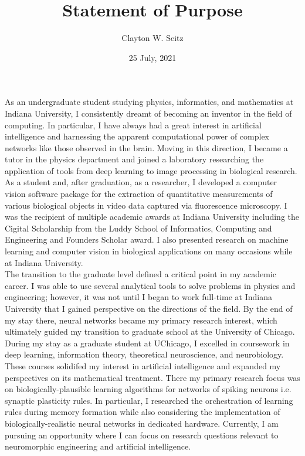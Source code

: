 \documentclass{article}
\title{Statement of Purpose}
\author{Clayton W. Seitz}
\date{25 July, 2021}
\begin{document}
  \maketitle%
\vspace{0.4in}

\indent As an undergraduate student studying physics, informatics, and mathematics at Indiana University, I consistently dreamt of becoming an inventor in the field of computing. In particular, I have always had a great interest in artificial intelligence and harnessing the apparent computational power of complex networks like those observed in the brain. Moving in this direction, I became a tutor in the physics department and joined a laboratory researching the application of tools from deep learning to image processing in biological research. As a student and, after graduation, as a researcher, I developed a computer vision software package for the extraction of quantitative measurements of various biological objects in video data captured via fluorescence microscopy. I was the recipient of multiple academic awards at Indiana University including the Cigital Scholarship from the Luddy School of Informatics, Computing and Engineering and Founders Scholar award. I also presented research on machine learning and computer vision in biological applications on many occasions while at Indiana University.\\
\indent  The transition to the graduate level defined a critical point in my academic career. I was able to use several analytical tools to solve problems in physics and engineering; however, it was not until I began to work full-time at Indiana University that I gained perspective on the directions of the field. By the end of my stay there, neural networks became my primary research interest, which ultimately guided my transition to graduate school at the University of Chicago. During my stay as a graduate student at UChicago, I excelled in coursework in deep learning, information theory, theoretical neuroscience, and neurobiology. These courses solidifed my interest in artificial intelligence and expanded my perspectives on its mathematical treatment. There my primary research focus was on biologically-plausible learning algorithms for networks of spiking neurons i.e. synaptic plasticity rules. In particular, I researched the orchestration of learning rules during memory formation while also considering the implementation of biologically-realistic neural networks in dedicated hardware. Currently, I am pursuing an opportunity where I can focus on research questions relevant to neuromorphic engineering and artificial intelligence.\\
\end{document}
